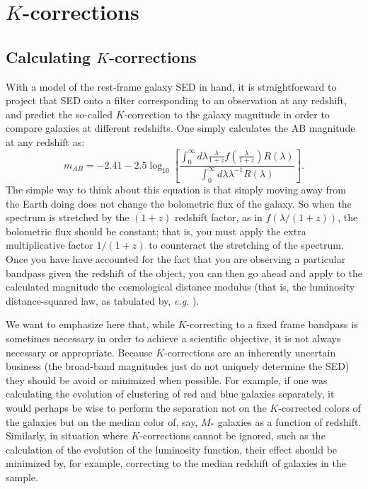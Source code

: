 \documentclass[10pt,preprint]{aastex}
\begin{document}
\section{$K$-corrections}
\label{kcorrection}

\subsection{Calculating $K$-corrections}

With a model of the rest-frame galaxy SED in hand, it is 
straightforward to project that SED onto a filter corresponding to 
an observation at any redshift, and predict the so-called
$K$-correction to the galaxy magnitude in order to compare galaxies 
at different redshifts. One simply calculates the AB magnitude at 
any redshift as:
\begin{equation}
m_{AB} = -2.41 - 2.5 \log_{10}\left[
\frac{\int_{0}^{\infty} d\lambda \frac{\lambda}{1+z}
f(\frac{\lambda}{1+z}) R(\lambda)}
{\int_{0}^{\infty} d\lambda \lambda^{-1} R(\lambda)}\right].
\end{equation}
The simple way to think about this equation is that simply moving away
from the Earth doing does not change the bolometric flux of the
galaxy. So when the spectrum is stretched by the $(1+z)$ redshift
factor, as in $f(\lambda/(1+z))$, the bolometric flux should be
constant; that is, you must apply the extra multiplicative factor
$1/(1+z)$ to counteract the stretching of the spectrum. Once you have
have accounted for the fact that you are observing a particular
bandpass given the redshift of the object, you can then go ahead and
apply to the calculated magnitude the cosmological distance modulus
(that is, the luminosity distance-squared law, as tabulated by, {\it
e.g.} \citealt{hogg97a}).

We want to emphasize here that, while $K$-correcting to a fixed frame
bandpass is sometimes necessary in order to achieve a scientific
objective, it is not always necessary or appropriate. Because
$K$-corrections are an inherently uncertain business (the broad-band
magnitudes just do not uniquely determine the SED) they should be
avoid or minimized when possible. For example, if one was calculating
the evolution of clustering of red and blue galaxies separately, it
would perhaps be wise to perform the separation not on the
$K$-corrected colors of the galaxies but on the median color of, say,
$M_\ast$ galaxies as a function of redshift. Similarly, in situation
where $K$-corrections cannot be ignored, such as the calculation of
the evolution of the luminosity function, their effect should be
minimized by, for example, correcting to the median redshift of
galaxies in the sample.
\end{document}
